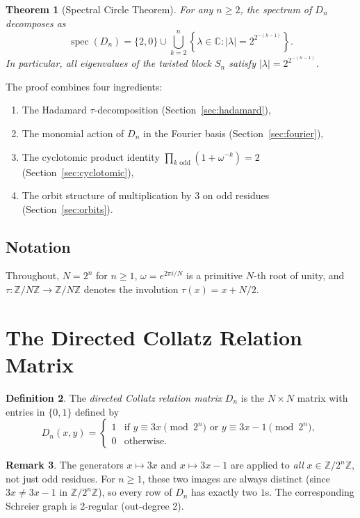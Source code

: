 \documentclass[11pt,reqno]{amsart}
\newtheorem{theorem}{Theorem}[section]
\theoremstyle{definition}
\newtheorem{definition}[theorem]{Definition}
\newtheorem{remark}[theorem]{Remark}
\begin{document}
\begin{theorem}[Spectral Circle Theorem]\label{thm:main}
For any $n \ge 2$, the spectrum of $D_n$ decomposes as
\[
\operatorname{spec}(D_n) = \{2, 0\} \cup \bigcup_{k=2}^{n} \left\{ \lambda \in \mathbb{C} : |\lambda| = 2^{2^{-(k-1)}} \right\}.
\]
In particular, all eigenvalues of the twisted block $S_n$ satisfy $|\lambda| = 2^{2^{-(n-1)}}$.
\end{theorem}

The proof combines four ingredients:
\begin{enumerate}
\item The Hadamard $\tau$-decomposition (Section~\ref{sec:hadamard}),
\item The monomial action of $D_n$ in the Fourier basis (Section~\ref{sec:fourier}),
\item The cyclotomic product identity $\prod_{k \text{ odd}} (1 + \omega^{-k}) = 2$ (Section~\ref{sec:cyclotomic}),
\item The orbit structure of multiplication by 3 on odd residues (Section~\ref{sec:orbits}).
\end{enumerate}

\subsection{Notation}
Throughout, $N = 2^n$ for $n \ge 1$, $\omega = e^{2\pi i / N}$ is a primitive $N$-th root of unity, and $\tau \colon \mathbb{Z}/N\mathbb{Z} \to \mathbb{Z}/N\mathbb{Z}$ denotes the involution $\tau(x) = x + N/2$.

\section{The Directed Collatz Relation Matrix}

\begin{definition}\label{def:collatz}
The \emph{directed Collatz relation matrix} $D_n$ is the $N \times N$ matrix with entries in $\{0, 1\}$ defined by
\[
D_n(x, y) = \begin{cases} 1 & \text{if } y \equiv 3x \pmod{2^n} \text{ or } y \equiv 3x - 1 \pmod{2^n}, \\ 0 & \text{otherwise.} \end{cases}
\]
\end{definition}

\begin{remark}
The generators $x \mapsto 3x$ and $x \mapsto 3x - 1$ are applied to \emph{all} $x \in \mathbb{Z}/2^n\mathbb{Z}$, not just odd residues. For $n \ge 1$, these two images are always distinct (since $3x \ne 3x - 1$ in $\mathbb{Z}/2^n\mathbb{Z}$), so every row of $D_n$ has exactly two $1$s. The corresponding Schreier graph is 2-regular (out-degree 2).
\end{remark}
\end{document}
